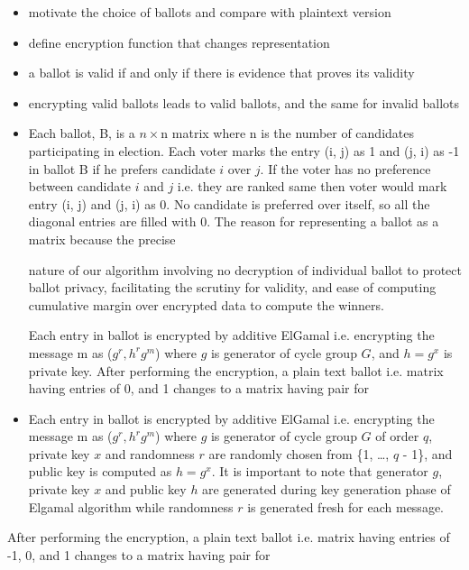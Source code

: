 \documentclass{llncs}
\begin{document}
\begin{itemize}
  \item motivate the choice of ballots and compare with plaintext
  version
  \item define encryption function that changes representation
  \item a ballot is valid if and only if there is evidence that
  proves its validity
  \item encrypting valid ballots leads to valid ballots, and the
  same for invalid ballots 
  
  \item Each ballot, B, is a $n\times$n matrix where n is the number of 
  candidates participating in election. Each voter marks the entry (i, j) as 1 
  and (j, i) as -1 in ballot B if  he prefers candidate $i$ over $j$. If the voter 
  has no preference between candidate $i$ and $j $ i.e. they are ranked 
  same then voter would mark entry (i, j) and (j, i) as 0. No candidate is 
  preferred over itself, so all the diagonal entries are  filled with 0.  The
   reason for representing a ballot as a matrix because the precise 

  nature of our algorithm involving no decryption of individual ballot to protect
  ballot privacy,  facilitating the scrutiny for validity, and ease of computing 
  cumulative margin over encrypted data to compute the winners. 
  
  
   

  Each entry in ballot is encrypted by additive ElGamal i.e. encrypting the 
  message m as ($g^{r}, h^{r}g^{m}$) where $g$ is generator of cycle group $G$, and 
  $h = g^{x}$ is private key. After performing the encryption, a plain text ballot 
  i.e. matrix having entries of 0, and 1 changes to a matrix having pair for 

  \item  Each entry in ballot is encrypted by additive ElGamal i.e. encrypting the 
  message m as ($g^{r}, h^{r}g^{m}$) where $g$ is generator of cycle group $G$ of order $q$,  private key $x$ and randomness $r$  are randomly  
  chosen from \{1, \ldots, $q$ - 1\}, and public key is computed as 
  $h = g^{x}$. It is important to note that generator $g$, private key $x$ and 
  public key $h$ are generated during key generation phase of Elgamal 
  algorithm while  randomness $r$  is generated fresh for each message.
 \end{itemize} 
  After performing the encryption, a plain text ballot 
  i.e. matrix having entries of -1,  0, and 1 changes to a matrix having pair for 
\end{document}
